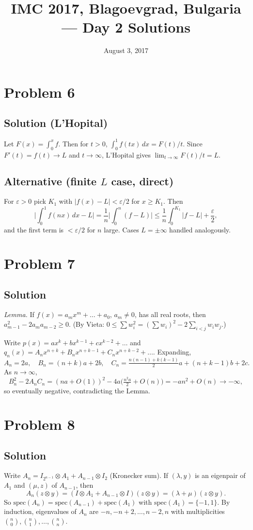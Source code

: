 \documentclass{article}
\title{IMC 2017, Blagoevgrad, Bulgaria --- Day 2 Solutions}
\date{August 3, 2017}
\begin{document}
\maketitle

\section*{Problem 6}
\subsection*{Solution (L'Hopital)}
Let $F(x) = \int_0^x f$. Then for $t > 0$, $\int_0^1 f(tx)\,dx = F(t)/t$. Since $F'(t) = f(t) \to L$ and $t \to \infty$, L'Hopital gives $\lim_{t \to \infty} F(t)/t = L$.

\subsection*{Alternative (finite $L$ case, direct)}
For $\varepsilon > 0$ pick $K_1$ with $|f(x) - L| < \varepsilon/2$ for $x \ge K_1$. Then
\[ \Big|\int_0^1 f(nx)\,dx - L\Big| = \frac{1}{n}\Big|\int_0^n (f-L)\Big| \le \frac{1}{n}\int_0^{K_1}|f-L| + \frac{\varepsilon}{2}, \]
and the first term is $< \varepsilon/2$ for $n$ large. Cases $L = \pm\infty$ handled analogously.

\section*{Problem 7}
\subsection*{Solution}
\emph{Lemma.} If $f(x) = a_m x^m + \dots + a_0$, $a_m \ne 0$, has all real roots, then $a_{m-1}^2 - 2 a_m a_{m-2} \ge 0$. (By Vieta: $0 \le \sum w_i^2 = (\sum w_i)^2 - 2\sum_{i<j} w_i w_j$.)

Write $p(x) = a x^k + b x^{k-1} + c x^{k-2} + \dots$ and $q_n(x) = A_n x^{n+k} + B_n x^{n+k-1} + C_n x^{n+k-2} + \dots$. Expanding,
\[ A_n = 2a,\quad B_n = (n+k)a + 2b,\quad C_n = \tfrac{n(n-1)+k(k-1)}{2} a + (n+k-1) b + 2c. \]
As $n \to \infty$,
\[ B_n^2 - 2 A_n C_n = (na + O(1))^2 - 4a\Big(\tfrac{n^2 a}{2} + O(n)\Big) = -a n^2 + O(n) \to -\infty, \]
so eventually negative, contradicting the Lemma.

\section*{Problem 8}
\subsection*{Solution}
Write $A_n = I_{2^{n-1}} \otimes A_1 + A_{n-1} \otimes I_2$ (Kronecker sum). If $(\lambda, y)$ is an eigenpair of $A_1$ and $(\mu, z)$ of $A_{n-1}$, then
\[ A_n (z \otimes y) = (I \otimes A_1 + A_{n-1} \otimes I)(z \otimes y) = (\lambda + \mu)(z \otimes y). \]
So $\mathrm{spec}(A_n) = \mathrm{spec}(A_{n-1}) + \mathrm{spec}(A_1)$ with $\mathrm{spec}(A_1) = \{-1, 1\}$. By induction, eigenvalues of $A_n$ are $-n, -n+2, \dots, n-2, n$ with multiplicities $\binom{n}{0}, \binom{n}{1}, \dots, \binom{n}{n}$.
\end{document}
